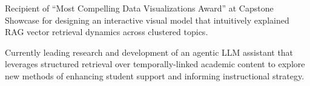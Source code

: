 \documentclass[letterpaper,11pt]{article}
\newcommand{\resumeItem}[1]{
  \item{\small{#1}}
  \vspace{-1.5px}
}
\begin{document}





\resumeItem{Recipient of “Most Compelling Data Visualizations Award” at Capstone Showcase for designing an interactive visual model that intuitively explained RAG vector retrieval dynamics across clustered topics.}

\resumeItem{Currently leading research and development of an agentic LLM assistant that leverages structured retrieval over temporally-linked academic content to explore new methods of enhancing student support and informing instructional strategy.}

\end{document}
